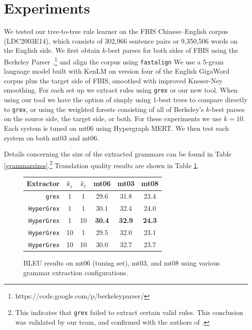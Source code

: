\documentclass[nofonts]{pbml} %
\begin{document}
\section{Experiments}
\label{sec:experiments}
We tested our tree-to-tree rule learner on the FBIS Chinese--English corpus (LDC2003E14), which consists of 302,966 sentence pairs or 9,350,506 words on the English side.
We first obtain $k$-best parses for both sides of FBIS using the Berkeley Parser \cite{dyer-chahuneau-smith:2013:NAACL-HLT}.\footnote{https://code.google.com/p/berkeleyparser/} and align the corpus using \texttt{fastalign}
We use a 5-gram language model built with KenLM on version four of the English GigaWord corpus plus the target side of FBIS, smoothed with improved Kneser-Ney smoothing.
For each set up we extract rules using \texttt{grex} \cite{hanneman2011general} or our new tool.
When using our tool we have the option of simply using $1$-best trees to compare directly to \texttt{grex}, or using the weighted forests consisting of all of Berkeley's $k$-best parses on
the source side, the target side, or both. For these experiments we use $k=10$.
Each system is tuned on mt06 using Hypergraph MERT.
We then test each system on both mt03 and mt06.

Details concerning the size of the extracted grammars can be found in Table \ref{grammarsizes}.\footnote{This indicates that \texttt{grex} failed to extract certain valid rules. This conclusion was validated by our team, and confirmed with the authors of \cite{hanneman2011general}.}
Translation quality results are shown in Table \ref{bleuresults}.

\begin{figure}
\centering
\begin{tabular}{r c c c c c}
Extractor & $k_s$ & $k_t$ & mt06 & mt03 & mt08 \\
\hline
\texttt{grex}      &  1 &  1 & 29.6 & 31.8 & 23.4 \\
\texttt{HyperGrex} &  1 &  1 & 30.1 & 32.4 & 24.0 \\
\texttt{HyperGrex} &  1 & 10 & \textbf{30.4} & \textbf{32.9} & \textbf{24.3} \\
\texttt{HyperGrex} & 10 &  1 & 29.5 & 32.0 & 23.1 \\
\texttt{HyperGrex} & 10 & 10 & 30.0 & 32.7 & 23.7 \\
\end{tabular}
\caption{\textsc{BLEU} results on mt06 (tuning set), mt03, and mt08 using various grammar extraction configurations.}
\label{bleuresults}
\end{figure}
\end{document}
